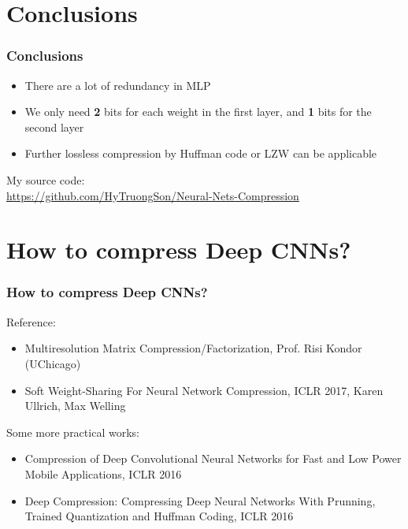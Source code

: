 \documentclass[7pt]{beamer}
\begin{document}
\begin{sloppypar}
\section{Conclusions}

\begin{frame}
\frametitle{Conclusions}
\begin{justify}
\begin{itemize}
	\item There are a lot of redundancy in MLP
	\item We only need \textbf{2} bits for each weight in the first layer, and \textbf{1} bits for the second layer
	\item Further lossless compression by Huffman code or LZW can be applicable
\end{itemize}
$$$$
My source code: \\
\href{https://github.com/HyTruongSon/Neural-Nets-Compression}{https://github.com/HyTruongSon/Neural-Nets-Compression}
\end{justify}
\end{frame}


\section{How to compress Deep CNNs?}

\begin{frame}
\frametitle{How to compress Deep CNNs?}
\begin{justify}
Reference:
\begin{itemize}
	\item Multiresolution Matrix Compression/Factorization, Prof. Risi Kondor (UChicago)
	\item Soft Weight-Sharing For Neural Network Compression, ICLR 2017, Karen Ullrich, Max Welling
\end{itemize}
$$$$
Some more practical works:
\begin{itemize}
	\item Compression of Deep Convolutional Neural Networks for Fast and Low Power Mobile Applications, ICLR 2016
	\item Deep Compression: Compressing Deep Neural Networks With Prunning, Trained Quantization and Huffman Coding, ICLR 2016
\end{itemize}
\end{justify}
\end{frame}


\end{sloppypar}
\end{document}

